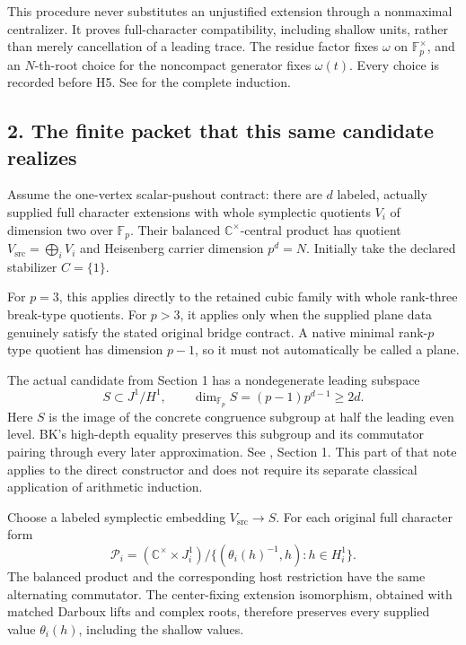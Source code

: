 This procedure never substitutes an unjustified extension through a
nonmaximal centralizer. It proves full-character compatibility,
including shallow units, rather than merely cancellation of a leading
trace. The residue factor fixes \(\omega\) on \(\mathbb F_p^\times\), and an
\(N\)-th-root choice for the noncompact generator fixes \(\omega(t)\).
Every choice is recorded before H5. See
 for the
complete induction.

\hypertarget{odd_synthesis-the-finite-packet-that-this-same-candidate-realizes}{%
\subsection{2. The finite packet that this same candidate
realizes}\label{odd_synthesis-the-finite-packet-that-this-same-candidate-realizes}}

Assume the one-vertex scalar-pushout contract: there are \(d\) labeled,
actually supplied full character extensions with whole symplectic
quotients \(V_i\) of dimension two over \(\mathbb F_p\). Their balanced
\(\mathbb C^\times\)-central product has quotient
\(V_{\mathrm{src}}=\bigoplus_iV_i\) and Heisenberg carrier dimension
\(p^d=N\). Initially take the declared stabilizer \(C=\{1\}\).

For \(p=3\), this applies directly to the retained cubic family with
whole rank-three break-type quotients. For \(p>3\), it applies only when
the supplied plane data genuinely satisfy the stated original bridge
contract. A native minimal rank-\(p\) type quotient has dimension
\(p-1\), so it must not automatically be called a plane.

The actual candidate from Section 1 has a nondegenerate leading subspace
\[
S\subset J^1/H^1,\qquad
\dim_{\mathbb F_p}S=(p-1)p^{d-1}\ge2d.
\] Here \(S\) is the image of the concrete congruence subgroup at half
the leading even level. BK's high-depth equality preserves this subgroup
and its commutator pairing through every later approximation. See
, Section 1. This part
of that note applies to the direct constructor and does not require its
separate classical application of arithmetic induction.

Choose a labeled symplectic embedding \(V_{\mathrm{src}}\to S\). For
each original full character form \[
\mathcal P_i=(\mathbb C^\times\times J_i^1)/
 \{(\theta_i(h)^{-1},h):h\in H_i^1\}.
\] The balanced product and the corresponding host restriction have the
same alternating commutator. The center-fixing extension isomorphism,
obtained with matched Darboux lifts and complex roots, therefore
preserves every supplied value \(\theta_i(h)\), including the shallow
values.

